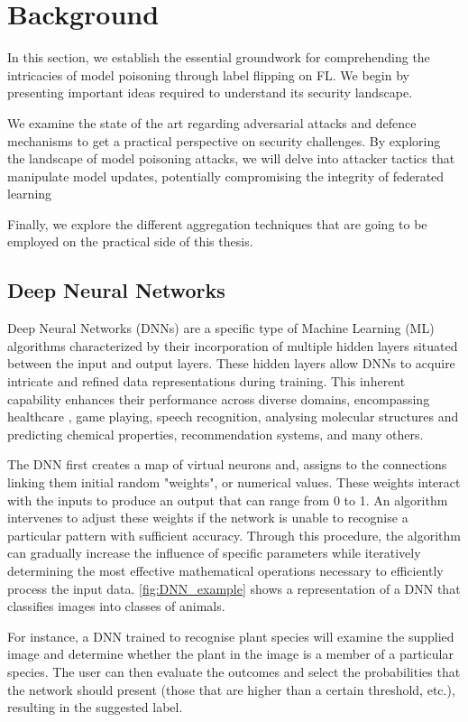 \section{Background} \label{sec:background}
In this section, we establish the essential groundwork for comprehending the intricacies of model poisoning through label flipping on FL. We begin by presenting important ideas required to understand its security landscape.

We examine the state of the art regarding adversarial attacks and defence mechanisms to get a practical perspective on security challenges. 
By exploring the landscape of model poisoning attacks, we will delve into attacker tactics that manipulate model updates, potentially compromising the integrity of federated learning

Finally, we explore the different aggregation techniques that are going to be employed on the practical side of this thesis.

\subsection{Deep Neural Networks}
Deep Neural Networks (DNNs) are a specific type of Machine Learning (ML) algorithms characterized by their incorporation of multiple hidden layers situated between the input and output layers. These hidden layers allow DNNs to acquire intricate and refined data representations during training. This inherent capability enhances their performance across diverse domains, encompassing healthcare \cite{BreastCancerComputerVision}, game playing, speech recognition, analysing molecular structures and predicting chemical properties, recommendation systems, and many others.

The DNN first creates a map of virtual neurons and, assigns to the connections linking them initial random "weights", or numerical values. These weights interact with the inputs to produce an output that can range from 0 to 1. An algorithm intervenes to adjust these weights if the network is unable to recognise a particular pattern with sufficient accuracy. Through this procedure, the algorithm can gradually increase the influence of specific parameters while iteratively determining the most effective mathematical operations necessary to efficiently process the input data. \autoref{fig:DNN_example} shows a representation of a DNN that classifies images into classes of animals.

For instance, a DNN trained to recognise plant species will examine the supplied image and determine whether the plant in the image is a member of a particular species. The user can then evaluate the outcomes and select the probabilities that the network should present (those that are higher than a certain threshold, etc.), resulting in the suggested label.

